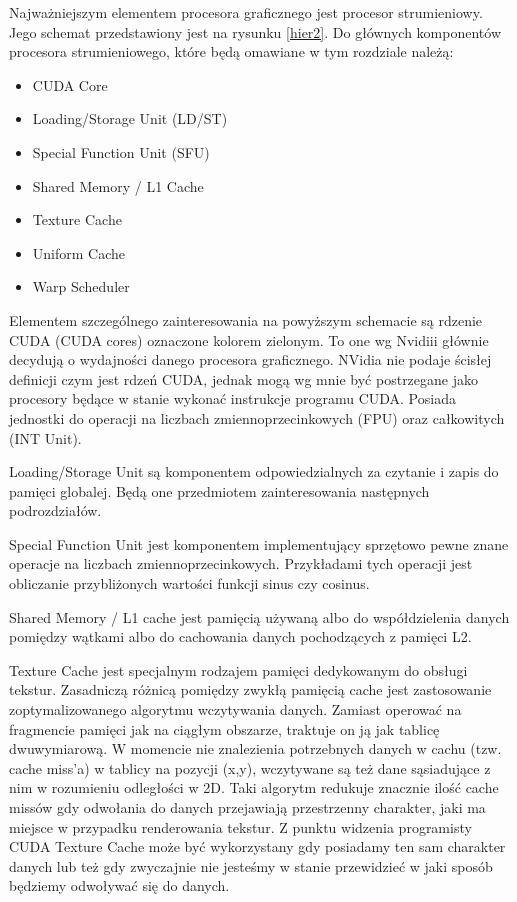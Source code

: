 Najważniejszym elementem procesora graficznego jest procesor strumieniowy.
Jego schemat przedstawiony jest na rysunku \ref{hier2}. Do głównych komponentów
procesora strumieniowego, które będą omawiane w tym rozdziale należą:

\begin{itemize}
\item CUDA Core
\item Loading/Storage Unit (LD/ST)
\item Special Function Unit (SFU)
\item Shared Memory / L1 Cache
\item Texture Cache
\item Uniform Cache
\item Warp Scheduler
\end{itemize}

Elementem szczególnego  zainteresowania na powyższym schemacie są rdzenie CUDA
(CUDA cores) oznaczone kolorem zielonym. To one wg Nvidiii głównie decydują o
wydajności danego procesora graficznego. NVidia nie podaje ścisłej definicji
czym jest rdzeń CUDA, jednak mogą wg mnie być postrzegane jako procesory będące w
stanie wykonać instrukcje programu CUDA. Posiada jednostki do operacji
na liczbach zmiennoprzecinkowych (FPU) oraz całkowitych (INT Unit).

Loading/Storage Unit są komponentem odpowiedzialnych za czytanie i zapis do
pamięci globalej. Będą one przedmiotem zainteresowania następnych podrozdziałów.

Special Function Unit jest komponentem implementujący sprzętowo pewne znane
operacje na liczbach zmiennoprzecinkowych. Przykładami tych operacji jest
obliczanie przybliżonych wartości funkcji sinus czy cosinus.

Shared Memory / L1 cache jest pamięcią używaną albo do współdzielenia danych
pomiędzy wątkami albo do cachowania danych pochodzących z pamięci L2.

Texture Cache jest specjalnym rodzajem pamięci dedykowanym do obsługi tekstur.
Zasadniczą różnicą pomiędzy zwykłą pamięcią cache jest zastosowanie
zoptymalizowanego algorytmu wczytywania danych. Zamiast operować na fragmencie
pamięci jak na ciągłym obszarze, traktuje on ją jak tablicę dwuwymiarową. W
momencie nie znalezienia potrzebnych danych w cachu (tzw. cache miss'a) w
tablicy na pozycji (x,y), wczytywane są też dane sąsiadujące z nim w rozumieniu
odległości w 2D. Taki algorytm redukuje znacznie ilość cache missów gdy
odwołania do danych przejawiają przestrzenny charakter, jaki ma miejsce w
przypadku renderowania tekstur. Z punktu widzenia programisty CUDA Texture Cache może być
wykorzystany gdy posiadamy ten sam charakter danych lub też gdy zwyczajnie nie
jesteśmy w stanie przewidzieć w jaki sposób będziemy odwoływać się do danych.

